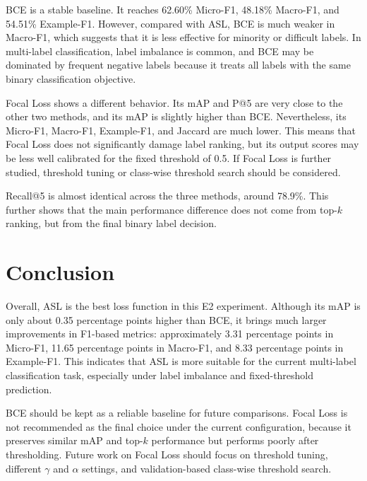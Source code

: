 \documentclass{article}
\begin{document}
BCE is a stable baseline. It reaches 62.60\% Micro-F1, 48.18\% Macro-F1, and
54.51\% Example-F1. However, compared with ASL, BCE is much weaker in Macro-F1,
which suggests that it is less effective for minority or difficult labels. In
multi-label classification, label imbalance is common, and BCE may be dominated by
frequent negative labels because it treats all labels with the same binary
classification objective.

Focal Loss shows a different behavior. Its mAP and P@5 are very close to the other
two methods, and its mAP is slightly higher than BCE. Nevertheless, its Micro-F1,
Macro-F1, Example-F1, and Jaccard are much lower. This means that Focal Loss does
not significantly damage label ranking, but its output scores may be less well
calibrated for the fixed threshold of 0.5. If Focal Loss is further studied,
threshold tuning or class-wise threshold search should be considered.

Recall@5 is almost identical across the three methods, around 78.9\%. This further
shows that the main performance difference does not come from top-\(k\) ranking,
but from the final binary label decision.

\section{Conclusion}

Overall, ASL is the best loss function in this E2 experiment. Although its mAP is
only about 0.35 percentage points higher than BCE, it brings much larger
improvements in F1-based metrics: approximately 3.31 percentage points in
Micro-F1, 11.65 percentage points in Macro-F1, and 8.33 percentage points in
Example-F1. This indicates that ASL is more suitable for the current multi-label
classification task, especially under label imbalance and fixed-threshold
prediction.

BCE should be kept as a reliable baseline for future comparisons. Focal Loss is
not recommended as the final choice under the current configuration, because it
preserves similar mAP and top-\(k\) performance but performs poorly after
thresholding. Future work on Focal Loss should focus on threshold tuning, different
\(\gamma\) and \(\alpha\) settings, and validation-based class-wise threshold search.
\end{document}

